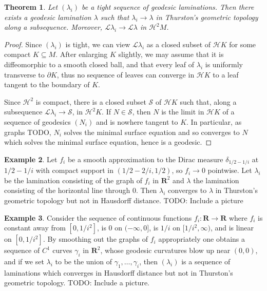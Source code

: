 \documentclass[reqno,11pt]{amsart}
\newcommand{\RR}{\mathbf{R}}
\newcommand{\Leaves}{\mathscr L}
\newcommand{\Hypspace}{\mathscr H}
\newtheorem{theorem}{Theorem}[section]
\theoremstyle{definition}
\newtheorem{example}[theorem]{Example}
\numberwithin{equation}{section}
\begin{document}
\begin{theorem}
Let $(\lambda_i)$ be a tight sequence of geodesic laminations.
Then there exists a geodesic lamination $\lambda$ such that $\lambda_i \to \lambda$ in Thurston's geometric topology along a subsequence.
Moreover, $\Leaves \lambda_i \to \Leaves \lambda$ in $\Hypspace^2 M$.
\end{theorem}
\begin{proof}
Since $(\lambda_i)$ is tight, we can view $\Leaves \lambda_i$ as a closed subset of $\Hypspace K$ for some compact $K \subseteq M$.
After enlarging $K$ slightly, we may assume that it is diffeomorphic to a smooth closed ball, and that every leaf of $\lambda_i$ is uniformly transverse to $\partial K$, thus no sequence of leaves can converge in $\Hypspace K$ to a leaf tangent to the boundary of $K$.

Since $\Hypspace^2$ is compact, there is a closed subset $\mathscr S$ of $\Hypspace K$ such that, along a subsequence $\Leaves \lambda_i \to \mathscr S$, in $\Hypspace^2 K$.
If $N \in \mathscr S$, then $N$ is the limit in $\Hypspace K$ of a sequence of geodesics $(N_i)$ and is nowhere tangent to $K$.
In particular, as graphs TODO, $N_i$ solves the minimal surface equation and so converges to $N$ which solves the minimal surface equation, hence is a geodesic.

\end{proof}

\begin{example}
Let $f_i$ be a smooth approximation to the Dirac measure $\delta_{1/2-1/i}$ at $1/2 - 1/i$ with compact support in $(1/2 - 2/i, 1/2)$, so $f_i \to 0$ pointwise.
Let $\lambda_i$ be the lamination consisting of the graph of $f_i$ in $\RR^2$ and $\lambda$ the lamination consisting of the horizontal line through $0$.
Then $\lambda_i$ converges to $\lambda$ in Thurston's geometric topology but not in Hausdorff distance.
TODO: Include a picture
\end{example}

\begin{example}\label{Hausdorff does not imply Thurston}
Consider the sequence of continuous functions $f_i: \RR \to \RR$ where $f_i$ is constant away from $[0, 1/i^2]$, is $0$ on $(-\infty, 0]$, is $1/i$ on $[1/i^2, \infty)$, and is linear on $[0, 1/i^2]$.
By smoothing out the graphs of $f_i$ appropriately one obtains a sequence of $C^1$ curves $\gamma_i$ in $\RR^2$, whose geodesic curvatures blow up near $(0, 0)$, and if we set $\lambda_i$ to be the union of $\gamma_1, \dots, \gamma_i$, then $(\lambda_i)$ is a sequence of laminations which converges in Hausdorff distance but not in Thurston's geometric topology.
TODO: Include a picture.
\end{example}
\end{document}
